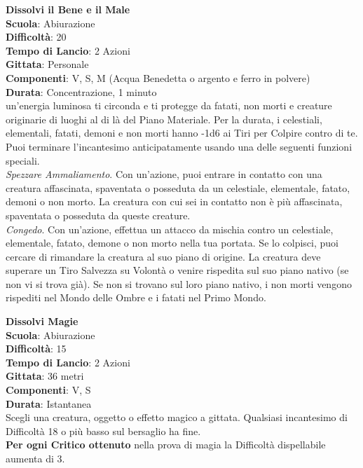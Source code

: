 \begin{multicols}{2}
\medskip\textbf{Dissolvi il Bene e il Male}\\
\textbf{Scuola}: Abiurazione\\
\textbf{Difficoltà}:  20\\
\textbf{Tempo di Lancio}: 2 Azioni\\
\textbf{Gittata}: Personale\\
\textbf{Componenti}: V, S, M (Acqua Benedetta o argento e ferro in polvere)\\
\textbf{Durata}: Concentrazione, 1 minuto \\
un'energia luminosa ti circonda e ti protegge da fatati, non morti e creature originarie di luoghi al di là del Piano Materiale. Per la durata, i celestiali, elementali, fatati, demoni e non morti hanno -1d6 ai Tiri per Colpire contro di te. Puoi terminare l'incantesimo anticipatamente usando una delle seguenti funzioni speciali.\\
\textit{Spezzare Ammaliamento}. Con un'azione, puoi entrare in contatto con una creatura affascinata, spaventata o posseduta da un celestiale, elementale, fatato, demoni o non morto. La creatura con cui sei in contatto non è più affascinata, spaventata o posseduta da queste creature.\\
\textit{Congedo}. Con un'azione, effettua un attacco da mischia contro un celestiale, elementale, fatato, demone o non morto nella tua portata. Se lo colpisci, puoi cercare di rimandare la creatura al suo piano di origine. La creatura deve superare un Tiro Salvezza su Volontà o venire rispedita sul suo piano nativo (se non vi si trova già). Se non si trovano sul loro piano nativo, i non morti vengono rispediti nel Mondo delle Ombre e i fatati nel Primo Mondo.

\medskip\textbf{Dissolvi Magie}\\
\textbf{Scuola}: Abiurazione\\
\textbf{Difficoltà}:  15\\
\textbf{Tempo di Lancio}: 2 Azioni\\
\textbf{Gittata}: 36 metri\\
\textbf{Componenti}: V, S\\
\textbf{Durata}: Istantanea\\
Scegli una creatura, oggetto o effetto magico a gittata. Qualsiasi incantesimo di Difficoltà 18 o più basso sul bersaglio ha fine. \\
\textbf{Per ogni Critico ottenuto} nella prova di magia la Difficoltà dispellabile aumenta di 3.


\end{multicols}
